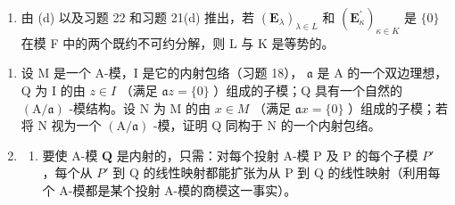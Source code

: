 \begin{enumerate}
  设 \((\mathrm{N}_{\kappa})_{\kappa\in K}\) 是 M 的一族不可分解子模，M 是它们的直和；由 (c)，每个 \(N_{\kappa}\) 同构于某个 \(M_{\lambda}\) ，反之亦然。设 T 为 M 的不可分解子模的类（在同构关系下）的集合，使得某个 \(M_{\lambda}\) （或某个 \(N_{\kappa}\) ）属于这些类之一。对所有 \(t\in T\) ，设 \(\mathrm{R}(t)\) （相应地 \(\mathrm{S}(t)\) ）为 \(\lambda\in L\) （相应地 \(\kappa\in K\) ）中使 \(M_{\lambda}\in t\) （相应地 \(N_{\kappa}\in t\) ）者组成的集合。证明：对所有 \(t\in T\) , \(\mathrm{Card}(\mathrm{R}(t))=\mathrm{Card}(\mathrm{S}(t))\) 。（在 (a) 的记号中，令 \(\mathrm{J}(\kappa)\) 为由满足如下条件的 \(\lambda\in L\) 组成的集合： \(\pi_{\lambda}\) 在 \(N_{\kappa}\) 上的限制是 \(N_{\kappa}\) 到 \(M_{\lambda}\) 上的一个同构；证明 \(\mathrm{J}(\kappa)\) 是有限的，并且诸 \(\mathrm{J}(\kappa)\) 覆盖 \(\mathrm{R}(t)\) （当 \(\kappa\) 遍历 \(\mathrm{S}(t)\) 时）。由此推出， \(\mathrm{Card}(\mathrm{S}(t))\leqslant\mathrm{Card}(\mathrm{R}(t))\) （当 \(\mathrm{R}(t)\) 无限时）。当 \(\mathrm{R}(t)\) 有限时，借助 (a) 证明 M 是诸 \(M_{\lambda}\) （ \(\lambda\notin R(t)\) ）与 \((\mathrm{N}_{\kappa})_{\kappa\in\mathrm{S}(t)}\) 的一个基数为 \(\mathrm{R}(t)\) 的子族的直和。
\item
  由 (d) 以及习题 22 和习题 21(d) 推出，若 \((\mathbf{E}_{\lambda})_{\lambda \in L}\) 和 \((\mathbf{E}_{\kappa}^{\prime})_{\kappa \in K}\) 是 \(\{0\}\) 在模 F 中的两个既约不可约分解，则 L 与 K 是等势的。
\end{enumerate}

\begin{enumerate}
\def\labelenumi{\arabic{enumi}.}
\setcounter{enumi}{23}
\item
  设 M 是一个 A-模，I 是它的内射包络（习题 18）， \(\mathfrak{a}\) 是 A 的一个双边理想，Q 为 I 的由 \(z \in I\) （满足 \(\mathfrak{a}z = \{0\}\) ）组成的子模；Q 具有一个自然的 \((\mathrm{A}/\mathfrak{a})\) -模结构。设 N 为 M 的由 \(x \in M\) （满足 \(\mathfrak{a}x = \{0\}\) ）组成的子模；若将 N 视为一个 \((\mathrm{A}/\mathfrak{a})\) -模，证明 Q 同构于 N 的一个内射包络。
\item
  \begin{enumerate}
  \def\labelenumii{(\alph{enumii})}
  \tightlist
  \item
    要使 A-模 \(\mathbf{Q}\) 是内射的，只需：对每个投射 A-模 P 及 P 的每个子模 \(P'\) ，每个从 \(P'\) 到 Q 的线性映射都能扩张为从 P 到 Q 的线性映射（利用每个 A-模都是某个投射 A-模的商模这一事实）。
  \end{enumerate}
\end{enumerate}

